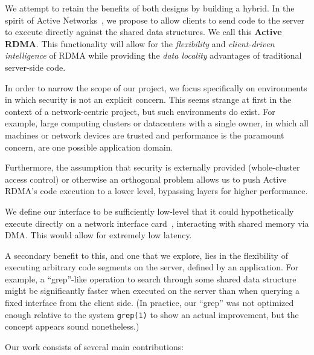 \documentclass[10pt]{article}
\begin{document}
We attempt to retain the benefits of both designs by building a
hybrid. In the spirit of Active Networks~\cite{AN-survey}, we propose
to allow clients to send code to the server to execute directly
against the shared data structures. We call this \textbf{Active
  RDMA}. This functionality will allow for the \emph{flexibility} and
\emph{client-driven intelligence} of RDMA while providing the
\emph{data locality} advantages of traditional server-side code.

In order to narrow the scope of our project, we focus specifically on
environments in which security is not an explicit concern. This seems
strange at first in the context of a network-centric project, but
such environments do exist. For example, large computing clusters or
datacenters with a single owner, in which all machines or network
devices are trusted and performance is the paramount concern, are one
possible application domain.

Furthermore, the assumption that security is externally provided
(whole-cluster access control) or otherwise an orthogonal problem
allows us to push Active RDMA's code execution to a lower level,
bypassing layers for higher performance. 

We define our interface to be sufficiently low-level that it could
hypothetically execute directly on a network interface
card~\cite{nic-basedreduction}, interacting with shared memory via
DMA.  This would allow for extremely low latency.

A secondary benefit to this, and one that we explore, lies in the
flexibility of executing arbitrary code segments on the server,
defined by an application. For example, a ``grep''-like operation to
search through some shared data structure might be significantly
faster when executed on the server than when querying a fixed
interface from the client side. (In practice, our ``grep'' was not
optimized enough relative to the system {\tt grep(1)} to show an
actual improvement, but the concept appears sound nonetheless.)

Our work consists of several main contributions:
\end{document}
